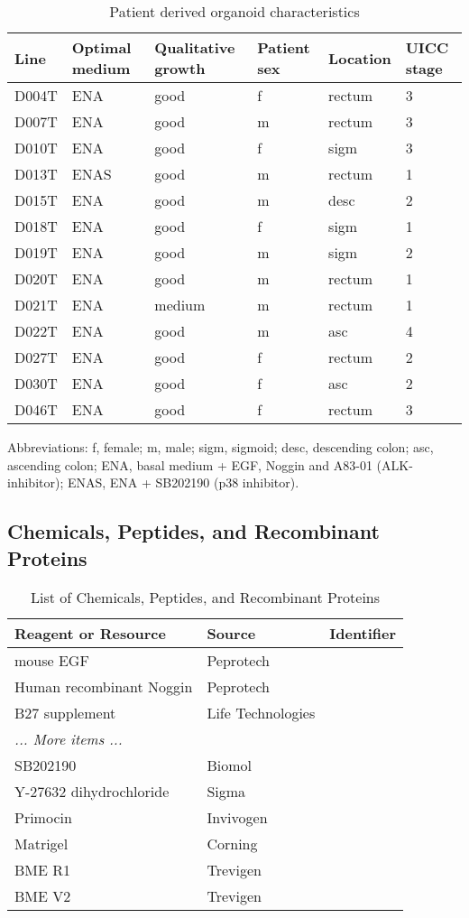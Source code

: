 \begin{flushleft}
\begin{table}[htbp]
\caption{Patient derived organoid characteristics}
\label{tab:patient_organoid}
\begin{tabularx}{\textwidth}{lXXXXX}
\toprule
\textbf{Line} & \textbf{Optimal medium} & \textbf{Qualitative growth} & \textbf{Patient sex} & \textbf{Location} & \textbf{UICC stage} \\
\midrule
D004T & ENA & good & f & rectum & 3 \\
D007T & ENA & good & m & rectum & 3 \\
D010T & ENA & good & f & sigm & 3 \\
D013T & ENAS & good & m & rectum & 1 \\
D015T & ENA & good & m & desc & 2 \\
D018T & ENA & good & f & sigm & 1 \\
D019T & ENA & good & m & sigm & 2 \\
D020T & ENA & good & m & rectum & 1 \\
D021T & ENA & medium & m & rectum & 1 \\
D022T & ENA & good & m & asc & 4 \\
D027T & ENA & good & f & rectum & 2 \\
D030T & ENA & good & f & asc & 2 \\
D046T & ENA & good & f & rectum & 3 \\
\bottomrule
\end{tabularx}
\end{table}

Abbreviations: f, female; m, male; sigm, sigmoid; desc, descending colon; asc, ascending colon; ENA, basal medium + EGF, Noggin and A83-01 (ALK-inhibitor); ENAS, ENA + SB202190 (p38 inhibitor).


\subsection*{Chemicals, Peptides, and Recombinant Proteins}
\begin{table}[htb]
\caption{List of Chemicals, Peptides, and Recombinant Proteins}
\label{tab:chemicals} %
\begin{tabularx}{\textwidth}{Xll}
\toprule
\textbf{Reagent or Resource} & \textbf{Source} & \textbf{Identifier} \\
\midrule
mouse EGF & Peprotech &  \\
Human recombinant Noggin & Peprotech &  \\
B27 supplement & Life Technologies &  \\
\textit{... More items ...} \\
SB202190 & Biomol &  \\
Y-27632 dihydrochloride & Sigma &  \\
Primocin & Invivogen &  \\
Matrigel & Corning &  \\
BME R1 & Trevigen &  \\
BME V2 & Trevigen &  \\
\bottomrule
\end{tabularx}
\end{table}


\end{flushleft}
